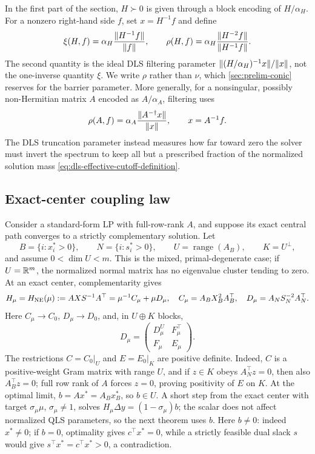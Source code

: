 In the first part of the section, $H\succ0$ is given through a block encoding
of $H/\alpha_H$.  For a nonzero right-hand side $f$, set $x=H^{-1}f$ and
define
\begin{equation}
 \xi(H,f)=\alpha_H\frac{\lVert H^{-1}f\rVert}{\lVert f\rVert},
 \qquad
 \rho(H,f)=\alpha_H
 \frac{\lVert H^{-2}f\rVert}{\lVert H^{-1}f\rVert}.
 \label{eq:dls-two-parameters}
\end{equation}
The second quantity is the ideal DLS filtering parameter
$\lVert(H/\alpha_H)^{-1}x\rVert/\lVert x\rVert$, not the one-inverse quantity $\xi$.
We write $\rho$ rather than $\nu$, which \cref{sec:prelim-conic} reserves
for the barrier parameter.  More generally, for a nonsingular, possibly
non-Hermitian matrix $A$ encoded as $A/\alpha_A$, filtering uses
\begin{equation}
 \rho(A,f)=\alpha_A\frac{\lVert A^{-\dagger}x\rVert}{\lVert x\rVert},
 \qquad x=A^{-1}f.
 \label{eq:dls-general-filtering-parameter}
\end{equation}
The DLS truncation parameter instead measures how far toward zero the
solver must invert the spectrum to keep all but a prescribed fraction of the
normalized solution mass \eqref{eq:dls-effective-cutoff-definition}.

\subsection{Exact-center coupling law}
\label{sec:beyond-kappa-coupling}

Consider a standard-form LP with full-row-rank $A$, and suppose its exact
central path converges to a strictly complementary solution.  Let
\[
 B=\{i:x_i^*>0\},\qquad N=\{i:s_i^*>0\},\qquad
 U=\operatorname{range}(A_B),\qquad K=U^\perp,
\]
and assume $0<\dim U<m$.  This is the mixed, primal-degenerate case; if
$U=\mathbb{R}^m$, the normalized normal matrix has no eigenvalue cluster tending to
zero.
At an exact center, complementarity gives
\begin{equation}
 H_\mu=H_{\rm NE}(\mu):=AXS^{-1}A^\top
 =\mu^{-1}C_\mu+\mu D_\mu,
 \quad
 C_\mu=A_BX_B^2A_B^\top,
 \quad
 D_\mu=A_NS_N^{-2}A_N^\top.
 \label{eq:coupling-normal-split}
\end{equation}
Here $C_\mu\to C_0$, $D_\mu\to D_0$, and, in $U\oplus K$ blocks,
\[
 D_\mu=
 \begin{pmatrix}D_\mu^U&F_\mu^\top\\F_\mu&E_\mu\end{pmatrix}.
\]
The restrictions $C=C_0|_U$ and $E=E_0|_K$ are positive definite.  Indeed,
$C$ is a positive-weight Gram matrix with range $U$, and if $z\in K$ obeys
$A_N^\top z=0$, then also $A_B^\top z=0$; full row rank of $A$ forces
$z=0$, proving positivity of $E$ on $K$.  At the optimal limit,
$b=Ax^*=A_Bx_B^*$, so $b\in U$.  A short step from the exact center with
target
$\sigma_\mu\mu$, $\sigma_\mu\ne1$, solves
$H_\mu\Delta y=(1-\sigma_\mu)b$; the scalar does not affect normalized QLS
parameters, so the next theorem uses $b$.  Here $b\ne0$: indeed $x^*\ne0$; if $b=0$,
optimality gives $c^\top x^*=0$, while a strictly feasible dual slack $s$
would give $s^\top x^*=c^\top x^*>0$, a contradiction.

